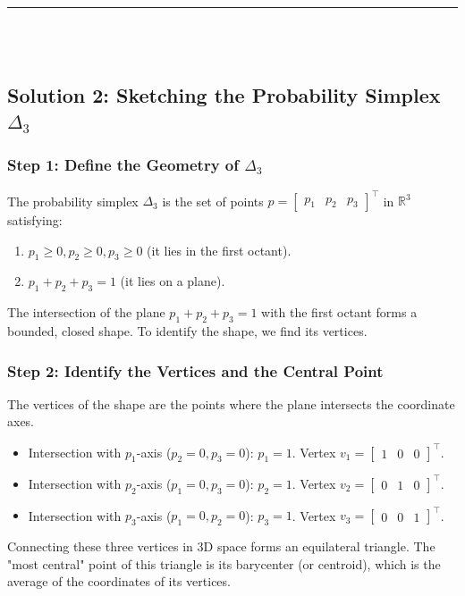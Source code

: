 \documentclass{article}
\begin{document}
\noindent\rule{\textwidth}{0.4pt}\\\\

\subsection*{Solution 2: Sketching the Probability Simplex $\Delta_3$}

\subsubsection*{Step 1: Define the Geometry of $\Delta_3$}
\parbox{\textwidth}{The probability simplex $\Delta_3$ is the set of points $p = \begin{bmatrix} p_1 & p_2 & p_3 \end{bmatrix}^\top$ in $\mathbb{R}^3$ satisfying:
\begin{enumerate}
    \item $p_1 \geq 0, p_2 \geq 0, p_3 \geq 0$ (it lies in the first octant).
    \item $p_1 + p_2 + p_3 = 1$ (it lies on a plane).
\end{enumerate}
The intersection of the plane $p_1+p_2+p_3=1$ with the first octant forms a bounded, closed shape. To identify the shape, we find its vertices.}

\subsubsection*{Step 2: Identify the Vertices and the Central Point}
\parbox{\textwidth}{The vertices of the shape are the points where the plane intersects the coordinate axes.
\begin{itemize}
    \item Intersection with $p_1$-axis ($p_2=0, p_3=0$): $p_1 = 1$. Vertex $v_1 = \begin{bmatrix} 1 & 0 & 0 \end{bmatrix}^\top$.
    \item Intersection with $p_2$-axis ($p_1=0, p_3=0$): $p_2 = 1$. Vertex $v_2 = \begin{bmatrix} 0 & 1 & 0 \end{bmatrix}^\top$.
    \item Intersection with $p_3$-axis ($p_1=0, p_2=0$): $p_3 = 1$. Vertex $v_3 = \begin{bmatrix} 0 & 0 & 1 \end{bmatrix}^\top$.
\end{itemize}
Connecting these three vertices in 3D space forms an equilateral triangle. The "most central" point of this triangle is its barycenter (or centroid), which is the average of the coordinates of its vertices.}
\end{document}
